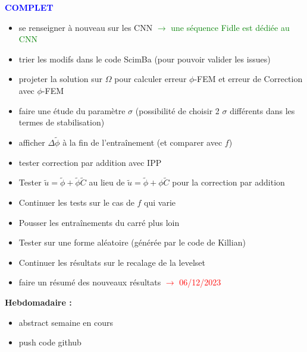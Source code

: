 \textcolor{blue}{\textbf{\large{COMPLET}}}

\begin{itemize}[label=$\square$]
	\item[\wontfix] se renseigner à nouveau sur les CNN \textcolor{green}{$\rightarrow$ une séquence Fidle est dédiée au CNN}
	\item[\later] trier les modifs dans le code ScimBa (pour pouvoir valider les issues)
	\item[\done] projeter la solution sur $\Omega$ pour calculer erreur $\phi$-FEM et erreur de Correction avec $\phi$-FEM
	\item[\later] faire une étude du paramètre $\sigma$ (possibilité de choisir 2 $\sigma$ différents dans les termes de stabilisation)
	\item[\later] afficher $\Delta \tilde{\phi}$ à la fin de l'entraînement (et comparer avec $f$)
	\item[\later] tester correction par addition avec IPP
	\item[\later] Tester $\tilde{u}=\tilde{\phi}+\tilde{\phi}\tilde{C}$ au lieu de $\tilde{u}=\tilde{\phi}+\phi\tilde{C}$ pour la correction par addition
	\item[\done] Continuer les tests sur le cas de $f$ qui varie
	\item[\wontfix] Pousser les entraînements du carré plus loin
	\item[\later] Tester sur une forme aléatoire (générée par le code de Killian)
	\item[\done] Continuer les résultats sur le recalage de la levelset
	\item[\done] faire un résumé des nouveaux résultats \textcolor{red}{$\rightarrow$ 06/12/2023}
\end{itemize}
\textbf{Hebdomadaire :}
\begin{itemize}[label=$\square$]
	\item[\done] abstract semaine en cours
	\item[\done] push code github
\end{itemize}